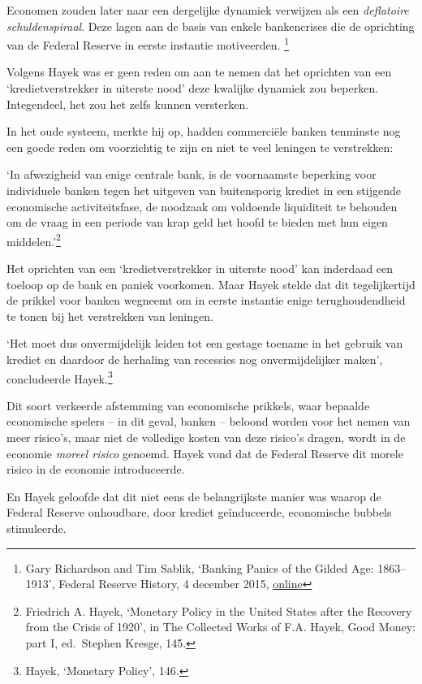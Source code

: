 \documentclass[
  a5paper,
  smalldemyvopaper,11pt,twoside,onecolumn,openright,extrafontsizes]{memoir}
\begin{document}
Economen zouden later naar een dergelijke dynamiek verwijzen als een
\emph{deflatoire schuldenspiraal}. Deze lagen aan de basis van enkele
bankencrises die de oprichting van de Federal Reserve in eerste
instantie motiveerden. \footnote{Gary Richardson and Tim Sablik,
  `Banking Panics of the Gilded Age: 1863--1913', Federal Reserve
  History, 4 december 2015,
  \href{https://www.federalreservehistory.org/essays/banking-panics-of-the-gilded-age.}{online}}

Volgens Hayek was er geen reden om aan te nemen dat het oprichten van
een `kredietverstrekker in uiterste nood' deze kwalijke dynamiek zou
beperken. Integendeel, het zou het zelfs kunnen versterken.

In het oude systeem, merkte hij op, hadden commerciële banken tenminste
nog een goede reden om voorzichtig te zijn en niet te veel leningen te
verstrekken:

`In afwezigheid van enige centrale bank, is de voornaamste beperking
voor individuele banken tegen het uitgeven van buitensporig krediet in
een stijgende economische activiteitsfase, de noodzaak om voldoende
liquiditeit te behouden om de vraag in een periode van krap geld het
hoofd te bieden met hun eigen middelen.'\footnote{\hspace{0pt}Friedrich
  A. Hayek, `Monetary Policy in the United States after the Recovery
  from the Crisis of 1920', in The Collected Works of F.A. Hayek, Good
  Money: part I, ed.~Stephen Kresge, 145.}

Het oprichten van een `kredietverstrekker in uiterste nood' kan
inderdaad een toeloop op de bank en paniek voorkomen. Maar Hayek stelde
dat dit tegelijkertijd de prikkel voor banken wegneemt om in eerste
instantie enige terughoudendheid te tonen bij het verstrekken van
leningen.

`Het moet dus onvermijdelijk leiden tot een gestage toename in het
gebruik van krediet en daardoor de herhaling van recessies nog
onvermijdelijker maken', concludeerde Hayek.\footnote{\hspace{0pt}Hayek,
  `Monetary Policy', 146.}

Dit soort verkeerde afstemming van economische prikkels, waar bepaalde
economische spelers -- in dit geval, banken -- beloond worden voor het
nemen van meer risico's, maar niet de volledige kosten van deze risico's
dragen, wordt in de economie \emph{moreel risico} genoemd. Hayek vond
dat de Federal Reserve dit morele risico in de economie introduceerde.

En Hayek geloofde dat dit niet eens de belangrijkste manier was waarop
de Federal Reserve onhoudbare, door krediet geïnduceerde, economische
bubbels stimuleerde.
\end{document}
